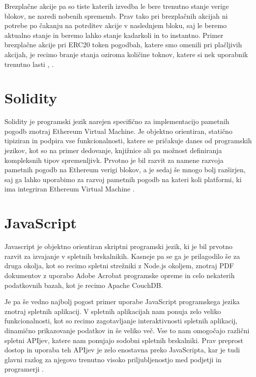 \documentclass[a4paper,12pt,openright]{book}
\begin{document}
Brezplačne akcije pa so tiste katerih izvedba le bere trenutno stanje verige blokov, ne naredi nobenih sprememb.
Prav tako pri brezplačnih akcijah ni potrebe po čakanju na potrditev akcije v naslednjem bloku, saj le beremo aktualno stanje in beremo lahko stanje kadarkoli in to instantno.
Primer brezplačne akcije pri ERC20 token pogodbah, katere smo omenili pri plačljivih akcijah, je recimo branje stanja oziroma količine toknov, katere si nek uporabnik trenutno lasti \cite{eth_smart_contract_intro}, \cite{erc20_token_standard}.

\section{Solidity}
Solidity je programski jezik narejen specifično za implementacijo pametnih pogodb znotraj Ethereum Virtual Machine.
Je objektno orientiran, statično tipiziran in podpira vse funkcionalnosti, katere se pričakuje danes od programskih jezikov,
kot so na primer dedovanje, knjižnice ali pa možnost definiranja kompleksnih tipov spremenljivk.
Prvotno je bil razvit za namene razvoja pametnih pogodb na Ethereum verigi blokov, a je sedaj še mnogo bolj razširjen,
saj ga lahko uporabimo za razvoj pametnih pogodb na kateri koli platformi, ki ima integriran Ethereum Virtual Machine \cite{solidity_docs}.

\section{JavaScript}
Javascript je objektno orientiran skriptni programski jezik, ki je bil prvotno razvit za izvajanje v spletnih brskalnikih.
Kasneje pa se ga je prilagodilo še za druga okolja, kot so recimo spletni strežniki z Node.js okoljem, znotraj PDF
dokumentov z uporabo Adobe Acrobat programske opreme in celo nekaterih podatkovnih bazah, kot je recimo Apache CouchDB.

Je pa še vedno najbolj pogost primer uporabe JavaScript programskega jezika znotraj spletnih aplikacij.
V spletnih aplikacijah nam ponuja zelo veliko funkcionalnosti, kot so recimo zagotavljanje interaktivnosti spletnih
aplikacij, dinamično prikazovanje podatkov in še veliko več.
Vse to nam omogočajo različni spletni APIjev, katere nam ponujajo sodobni spletnih brskalniki.
Prav preprost dostop in uporaba teh APIjev je zelo enostavna preko JavaScripta, kar je tudi glavni razlog za njegovo
trenutno visoko priljubljenostjo med podjetji in programerji \cite{javascript_mozilla}.
\end{document}
